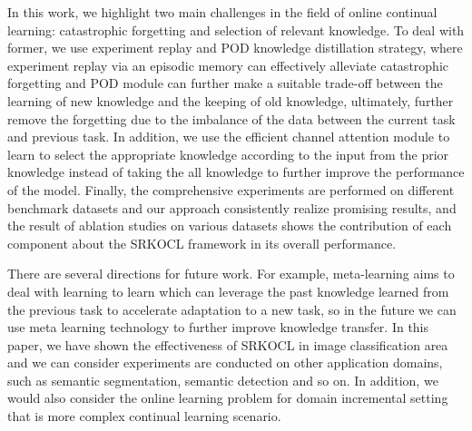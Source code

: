 \documentclass[review]{elsarticle}
\begin{document}
In this work, we highlight two main challenges in the field of online continual learning: catastrophic forgetting and selection of relevant knowledge. To deal with former, we use experiment replay and POD knowledge distillation strategy, where experiment replay via an episodic memory can effectively alleviate catastrophic forgetting and POD module can further make a suitable trade-off between the learning of new knowledge and the keeping of old knowledge, ultimately, further remove the forgetting due to the imbalance of the data between the current task and previous task. In addition, we use the efficient channel attention module to learn to select the appropriate knowledge according to the input from the prior knowledge instead of taking the all knowledge to further improve the performance of the model. Finally, the comprehensive experiments are performed on different benchmark datasets and our approach consistently realize promising results, and the result of ablation studies on various datasets shows the contribution of each component about the SRKOCL framework in its overall performance.

There are several directions for future work. For example, meta-learning aims to deal with learning to learn which can leverage the past knowledge learned from the previous task to accelerate adaptation to a new task, so in the future we can use meta learning technology to further improve knowledge transfer. In this paper, we have shown the effectiveness of SRKOCL in image classification area and we can consider experiments are conducted on other application domains, such as semantic segmentation, semantic detection and so on. In addition, we would also consider the online learning problem for domain incremental setting that is more complex continual learning scenario. 


\end{document}

